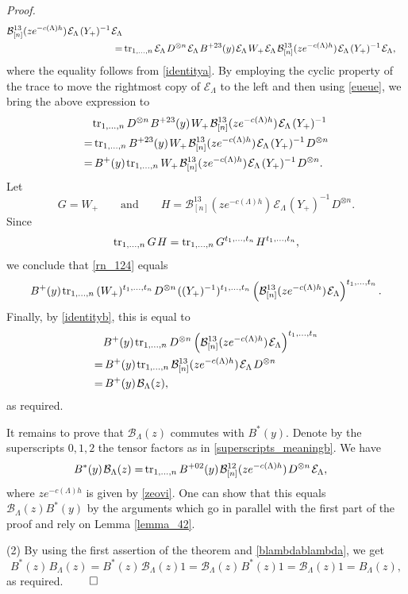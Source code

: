 \documentclass[12pt,a4paper,reqno]{amsart}
\theoremstyle{stil}
\theoremstyle{defi}
\theoremstyle{defi}
\theoremstyle{stil}
\theoremstyle{stil}
\theoremstyle{stil}
\theoremstyle{prim}
\newenvironment{prf}{\noindent \textit{Proof.}}{\null\hfill$\qed$\hskip
2mm\vskip 2mm}
\newcommand{\Fand}{\qquad\text{and}\qquad}
\newcommand{\non}{\nonumber}
\newcommand{\ot}{\otimes}
\newcommand{\ts}{\hspace{1pt}}
\newcommand{\Ec}{\mathcal{E}}
\newcommand{\tr}{ {\rm tr}}
\newcommand{\bc}{\mathcal{B}}
\begin{document}
\begin{prf}
\begin{align*}
\bc_{[n]}^{13}(ze^{-c(\Lambda)h})\ts \Ec_\Lambda\ts (Y_+)^{-1}  \ts \Ec_\Lambda\\
=&\,
\tr_{1,\ldots ,n} \,
  \Ec_\Lambda  \ts D^{\ot n} \ts \Ec_\Lambda\ts
B^{+23}(y)\ts \Ec_\Lambda\ts 
W_+\ts \Ec_\Lambda\ts 
\bc_{[n]}^{13}(ze^{-c(\Lambda)h})\ts \Ec_\Lambda\ts (Y_+)^{-1}  \ts \Ec_\Lambda,
\end{align*}
where the equality follows from \eqref{identitya}. By employing the cyclic property of the trace to move the rightmost copy of $ \Ec_\Lambda$ to the left and then using \eqref{eueue}, we bring the above expression to
\begin{align}
&\tr_{1,\ldots ,n} \,
    D^{\ot n} \ts  
B^{+23}(y)\ts  
W_+\ts  
\bc_{[n]}^{13}(ze^{-c(\Lambda)h})\ts \Ec_\Lambda\ts (Y_+)^{-1}   \non\\
=&\,
\tr_{1,\ldots ,n} \,
B^{+23}(y)\ts  
W_+\ts  
\bc_{[n]}^{13}(ze^{-c(\Lambda)h})\ts \Ec_\Lambda\ts (Y_+)^{-1} \ts D^{\ot n} \non \\ 
=&\,
B^{+ }(y)\ts 
\tr_{1,\ldots ,n} \,
W_+\ts  
\bc_{[n]}^{13}(ze^{-c(\Lambda)h})\ts \Ec_\Lambda\ts (Y_+)^{-1} \ts D^{\ot n}. \label{rn_124} 
\end{align}
Let
$$
G=W_+\Fand H= \bc_{[n]}^{13}(ze^{-c(\Lambda)h})\ts \Ec_\Lambda\ts (Y_+)^{-1} \ts D^{\ot n}.
$$
Since
$$
\tr_{1,\ldots ,n} \, G\ts H
=\tr_{1,\ldots ,n} \, G^{t_1,\ldots ,t_n}\ts H^{t_1,\ldots ,t_n},
$$
we conclude that \eqref{rn_124} equals
$$
B^{+ }(y)\ts 
\tr_{1,\ldots ,n} \,
(W_+)^{t_1,\ldots ,t_n}\ts  D^{\ot n}\ts ((Y_+)^{-1})^{t_1,\ldots ,t_n}
\left(\bc_{[n]}^{13}(ze^{-c(\Lambda)h})\ts \Ec_\Lambda\right)^{t_1,\ldots ,t_n}. 
$$
Finally, by \eqref{identityb}, this is equal to
\begin{align*}
&B^{+ }(y)\ts 
\tr_{1,\ldots ,n} \,
   D^{\ot n} 
\left(\bc_{[n]}^{13}(ze^{-c(\Lambda)h})\ts \Ec_\Lambda\right)^{t_1,\ldots ,t_n}\\
=&\, B^{+ }(y)\ts 
\tr_{1,\ldots ,n} \,
 \bc_{[n]}^{13}(ze^{-c(\Lambda)h})\ts \Ec_\Lambda \ts  D^{\ot n} \\
=&\,   B^+(y)\ts\mathcal{B}_\Lambda(z),
\end{align*}
as required.

It remains to prove that $\mathcal{B}_\Lambda(z)$ commutes with $B^*(y)$. 
Denote by the superscripts $0,1,2 $   the tensor factors as in \eqref{superscripts_meaningb}. 
We have
\begin{align*}
B^*(y)\ts \mathcal{B}_\Lambda(z)   = &\,
\tr_{1,\ldots ,n} \,B^{+02}(y)\ts \mathcal{B}^{ 12}_{[n]}(ze^{-c(\Lambda)h}) \ts D^{\ot n}\ts \Ec_\Lambda   , 
\end{align*}
where $ze^{-c(\Lambda)h}$ is given by \eqref{zeovi}. One can show that this equals  $ \mathcal{B}_\Lambda(z) B^*(y)$ by the arguments which go in parallel with the first part of the proof and rely on Lemma \ref{lemma_42}.

 
\noindent(2) By using the first assertion of the theorem and \eqref{blambdablambda},    we get
$$
B^*(z)\ts  B_\Lambda(z)
=B^*(z)\ts  \mathcal{B}_\Lambda(z)1
=\mathcal{B}_\Lambda(z)\ts B^*(z) 1
=\mathcal{B}_\Lambda(z)  1
=B_\Lambda(z),
$$
as required.
\end{prf}
\end{document}
